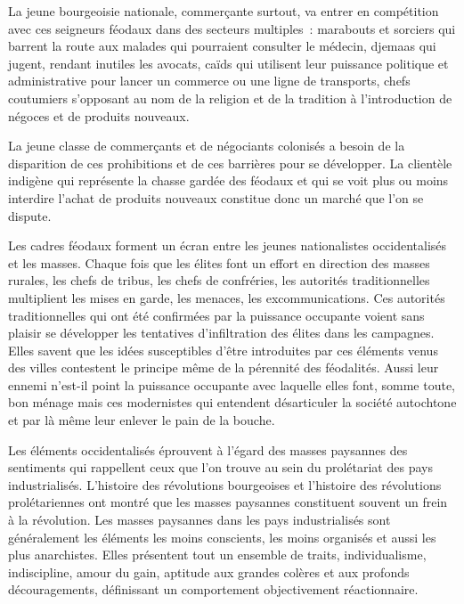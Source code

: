 \documentclass[french,twoside]{book} %
\begin{document}
La jeune bourgeoisie nationale, commerçante surtout, va entrer en compétition avec ces seigneurs féodaux dans des secteurs multiples : marabouts et sorciers qui barrent la route aux malades qui pourraient consulter le médecin, djemaas qui jugent, rendant inutiles les avocats, caïds qui utilisent leur puissance politique et administrative pour lancer un commerce ou une ligne de transports, chefs coutumiers s’opposant au nom de la religion et de la tradition à l’introduction de négoces et de produits nouveaux.\par
La jeune classe de commerçants et de négociants colonisés a besoin de la disparition de ces prohibitions et de ces barrières pour se développer. La clientèle indigène qui représente la chasse gardée des féodaux et qui se voit plus ou moins interdire l’achat de produits nouveaux constitue donc un marché que l’on se dispute.\par
Les cadres féodaux forment un écran entre les jeunes nationalistes occidentalisés et les masses. Chaque fois que les élites   font un effort en direction des masses rurales, les chefs de tribus, les chefs de confréries, les autorités traditionnelles multiplient les mises en garde, les menaces, les excommunications. Ces autorités traditionnelles qui ont été confirmées par la puissance occupante voient sans plaisir se développer les tentatives d’infiltration des élites dans les campagnes. Elles savent que les idées susceptibles d’être introduites par ces éléments venus des villes contestent le principe même de la pérennité des féodalités. Aussi leur ennemi n’est-il point la puissance occupante avec laquelle elles font, somme toute, bon ménage mais ces modernistes qui entendent désarticuler la société autochtone et par là même leur enlever le pain de la bouche.\par
Les éléments occidentalisés éprouvent à l’égard des masses paysannes des sentiments qui rappellent ceux que l’on trouve au sein du prolétariat des pays industrialisés. L’histoire des révolutions bourgeoises et l’histoire des révolutions prolétariennes ont montré que les masses paysannes constituent souvent un frein à la révolution. Les masses paysannes dans les pays industrialisés sont généralement les éléments les moins conscients, les moins organisés et aussi les plus anarchistes. Elles présentent tout un ensemble de traits, individualisme, indiscipline, amour du gain, aptitude aux grandes colères et aux profonds découragements, définissant un comportement objectivement réactionnaire.\par
\bigbreak
\end{document}
